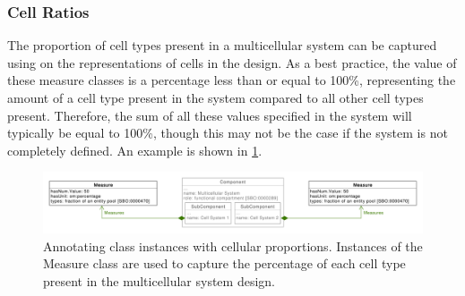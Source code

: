 \subsubsection{Cell Ratios}

The proportion of cell types present in a multicellular system can be captured using  on the representations of cells in the design.
As a best practice, the value of these measure classes is a percentage less than or equal to 100\%, representing the amount of a cell type present in the system compared to all other cell types present. 
Therefore, the sum of all these values specified in the system will typically be equal to 100\%, though this may not be the case if the system is not completely defined. 
An example is shown in \ref{uml:cell_ratios}.

\begin{figure}[ht]
	\begin{center}
		\includegraphics[width=\textwidth]{uml/cell_ratios}
		\caption[]{Annotating class instances with cellular proportions. Instances of the Measure class are used to capture the percentage of each cell type present in the multicellular system design.
		}
		\label{uml:cell_ratios}
	\end{center}
\end{figure}
